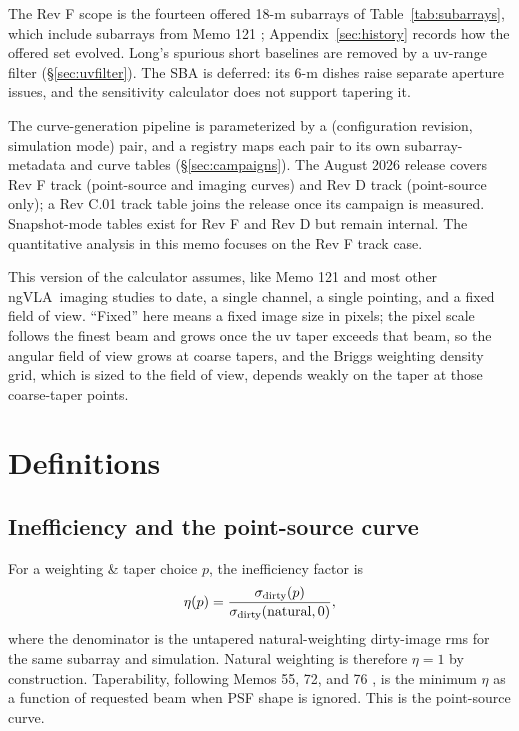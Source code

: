 \documentclass[11pt]{article}
\newcommand{\ngvla}{ngVLA}
\begin{document}
The Rev F scope is the fourteen offered 18-m subarrays of
Table~\ref{tab:subarrays}, which include subarrays from Memo 121
\cite{memo121}; Appendix~\ref{sec:history} records how the offered set
evolved.  Long's spurious short baselines are removed by a uv-range filter
(\S\ref{sec:uvfilter}).  The SBA is deferred: its 6-m dishes raise separate
aperture issues, and the sensitivity calculator does not support tapering
it.

The curve-generation pipeline is parameterized by a (configuration
revision, simulation mode) pair, and a registry maps each pair to its own
subarray-metadata and curve tables (\S\ref{sec:campaigns}).  The
August 2026 release covers Rev F track (point-source and imaging curves)
and Rev D track (point-source only); a Rev C.01 track table joins the
release once its campaign is measured.  Snapshot-mode tables exist for
Rev F and Rev D but remain internal.  The quantitative analysis in this
memo focuses on the Rev F track case.

This version of the calculator assumes, like Memo 121 and most other
\ngvla\ imaging studies to date, a single channel, a single pointing, and a
fixed field of view.  ``Fixed'' here means a fixed image size in pixels; the
pixel scale follows the finest beam and grows once the uv taper exceeds that
beam, so the angular field of view grows at coarse tapers, and the Briggs
weighting density grid, which is sized to the field of view, depends weakly
on the taper at those coarse-taper points.

\section{Definitions}

\subsection{Inefficiency and the point-source curve}
\label{sec:eta}

For a weighting \& taper choice $p$, the inefficiency factor is
\begin{equation}
  \eta(p) = {\sigma_{\rm dirty}(p) \over \sigma_{\rm dirty}({\rm natural},0)} ,
\end{equation}
where the denominator is the untapered natural-weighting dirty-image rms for
the same subarray and simulation.  Natural weighting is therefore $\eta=1$ by
construction.  Taperability, following Memos 55, 72, and 76
\cite{memo55,memo72,memo76}, is the minimum $\eta$ as a function of requested
beam when PSF shape is ignored.  This is the point-source curve.
\end{document}
